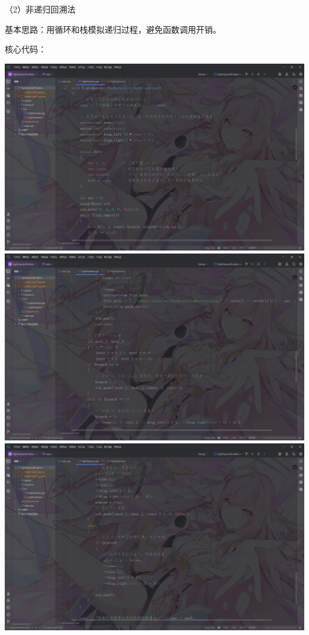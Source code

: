 \documentclass[12pt, a4paper, oneside]{ctexart}
\begin{document}
\begin{flushleft}
\songti\fontsize{16pt}{16pt}\selectfont
（2）非递归回溯法

基本思路：用循环和栈模拟递归过程，避免函数调用开销。

核心代码：
\end{flushleft}

\includegraphics[width=\textwidth]{../images/非递归回溯代码1.png}\\[0.5em]
\includegraphics[width=\textwidth]{../images/非递归回溯代码2.png}\\[0.5em]
\includegraphics[width=\textwidth]{../images/非递归回溯代码3.png}\\[0.5em]
\end{document}

